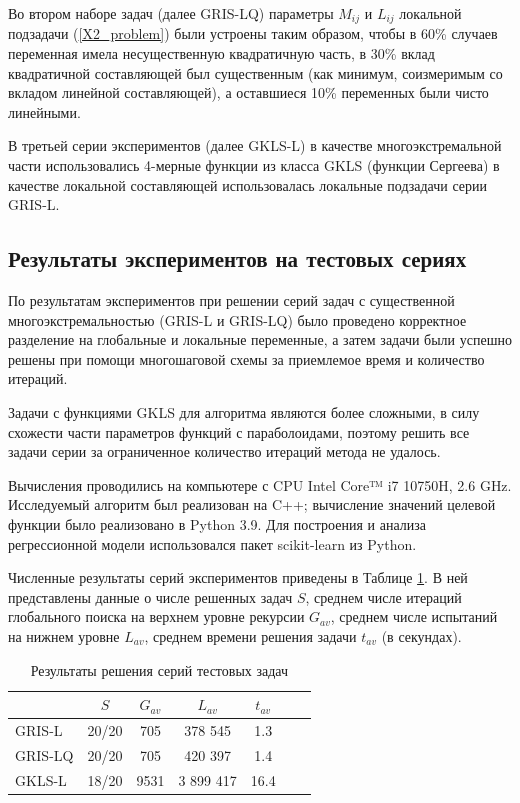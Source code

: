 \documentclass[11pt, oneside, a4paper]{article}
\begin{document}
Во втором наборе задач (далее GRIS-LQ) параметры $M_{ij}$ и $L_{ij}$ локальной подзадачи (\ref{X2_problem}) были устроены таким образом, чтобы в 60\% случаев переменная имела несущественную квадратичную часть, в 30\% вклад квадратичной составляющей был существенным (как минимум, соизмеримым со вкладом линейной составляющей), а оставшиеся 10\% переменных были чисто линейными.

В третьей серии экспериментов (далее GKLS-L) в качестве многоэкстремальной части использовались 4-мерные функции из класса GKLS (функции Сергеева) \cite{Sergeyev2013} в качестве локальной составляющей использовалась локальные подзадачи серии GRIS-L.

\subsection{Результаты экспериментов на тестовых сериях}

По результатам экспериментов при решении серий задач с существенной многоэкстремальностью (GRIS-L и GRIS-LQ) было проведено корректное разделение на глобальные и локальные переменные, а затем задачи были успешно решены при помощи многошаговой схемы за приемлемое время и количество итераций.

Задачи с функциями GKLS для алгоритма являются более сложными, в силу схожести части параметров функций с параболоидами, поэтому решить все задачи серии за ограниченное количество итераций метода не удалось.

Вычисления проводились на компьютере с CPU Intel Core™ i7 10750H, 2.6 GHz. Исследуемый алгоритм был реализован на C++; вычисление значений целевой функции было реализовано в Python 3.9. Для построения и анализа регрессионной модели использовался пакет scikit-learn из Python.

Численные результаты серий экспериментов приведены в Таблице \ref{tab1}. В ней представлены данные о числе решенных задач $S$, среднем числе итераций глобального поиска на верхнем уровне рекурсии $G_{av}$, среднем числе испытаний на нижнем уровне $L_{av}$, среднем времени решения задачи $t_{av}$ (в секундах).

\begin{table}[ht]
	\caption{Результаты решения серий тестовых задач}
	\label{tab1}
	\begin{center}
		\begin{tabular}{ l c c c c c c } \hline
		 & $S$ &  $G_{av}$ &  $L_{av}$ & $t_{av}$ \\
    \hline
		GRIS-L & 20/20  & 705 &  378 545 & 1.3 \\
		GRIS-LQ & 20/20 & 705 &  420 397 & 1.4 \\
		GKLS-L & 18/20 & 9531 &  3 899 417 & 16.4 \\
		\hline
		\end{tabular}
	\end{center}
\end{table}
\end{document}
